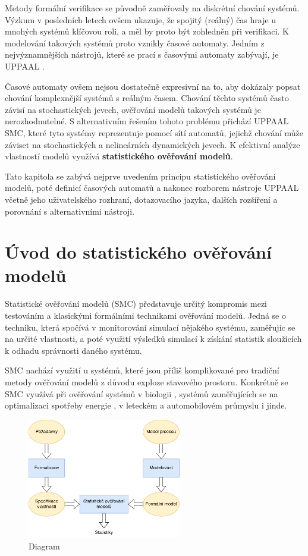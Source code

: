Metody formální verifikace se původně zaměřovaly na diskrétní chování systémů. Výzkum v posledních letech ovšem ukazuje, že spojitý (reálný) čas hraje u mnohých systémů klíčovou roli, a měl by proto být zohledněn při verifikaci. K modelování takových systémů proto vznikly časové automaty. Jedním z nejvýznamnějších nástrojů, které se prací s časovými automaty zabývají, je UPPAAL \cite{uppaal_smc}.

Časové automaty ovšem nejsou dostatečně expresivní na to, aby dokázaly popsat chování komplexnější systémů s reálným časem. Chování těchto systémů často závisí na stochastických jevech, ověřování modelů takových systémů je nerozhodnutelné. S alternativním řešením tohoto problému přichází UPPAAL SMC, které tyto systémy reprezentuje pomocí sítí automatů, jejichž chování může záviset na stochastických a nelineárních dynamických jevech. K efektivní analýze vlastností modelů využívá \textbf{statistického ověřování modelů}.

Tato kapitola se zabývá nejprve uvedením principu statistického ověřování modelů, poté definicí časových automatů a nakonec rozborem nástroje UPPAAL včetně jeho uživatelského rozhraní, dotazovacího jazyka, dalších rozšíření a porovnání s alternativními nástroji.

\section{Úvod do statistického ověřování modelů}
Statistické ověřování modelů (SMC) představuje určitý kompromis mezi testováním a klasickými formálními technikami ověřování modelů. Jedná se o techniku, která spočívá v monitorování simulací nějakého systému, zaměřujíc se na určité vlastnosti, a poté využití výsledků simulací k získání statistik sloužících k odhadu správnosti daného systému.

SMC nachází využití u systémů, které jsou příliš komplikované pro tradiční metody ověřování modelů z důvodu exploze stavového prostoru. Konkrétně se SMC využívá při ověřování systémů v biologii \cite{smc_biology}, systémů zaměřujících se na optimalizaci spotřeby energie \cite{smc_energy_centric}, v leteckém a automobilovém průmyslu i jinde.

\begin{figure}[H]
    \centering
    \includegraphics[width=0.6\textwidth]{obrazky-figures/smc_diagram.png}
    \caption{Diagram }
    \label{fig:smc_diagram}
\end{figure}

